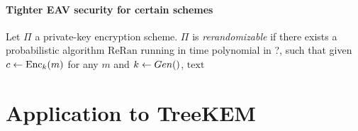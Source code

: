 \subsubsection{Tighter EAV security for certain schemes}

\begin{definition}[Rerandomizability]
	Let $\Pi$ a private-key encryption scheme. $\Pi$ is \emph{rerandomizable} if there exists a probabilistic algorithm $\mathrm{ReRan}$ running in time polynomial in ?, such that given $c \leftarrow \mathrm{Enc}_k(m)$ for any $m$ and $k \leftarrow Gen()$, $\mathrm{text}$
\end{definition}

\begin{lemma}

\end{lemma}

\chapter{Application to TreeKEM}
\label{sec:application-to-treekem}

